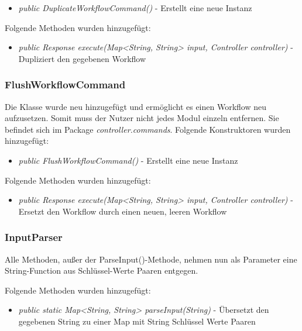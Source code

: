 \documentclass[parskip=full]{scrartcl}
\begin{document}
				\begin{itemize}
					\item \textit{public DuplicateWorkflowCommand()} - Erstellt eine neue Instanz
				\end{itemize}
				
				Folgende Methoden wurden hinzugefügt:
				\begin{itemize}
					\item \textit{public Response execute(Map<String, String> input, Controller controller)} - Dupliziert den gegebenen Workflow
				\end{itemize}
				
			
			\subsubsection{FlushWorkflowCommand}
			Die Klasse wurde neu hinzugefügt und ermöglicht es einen Workflow neu aufzusetzen. Somit muss der Nutzer nicht jedes Modul einzeln entfernen. Sie befindet sich im Package \textit{controller.commands}.
			Folgende Konstruktoren wurden hinzugefügt:
			\begin{itemize}
				\item \textit{public FlushWorkflowCommand()} - Erstellt eine neue Instanz
			\end{itemize}
			
			Folgende Methoden wurden hinzugefügt:
			\begin{itemize}
				\item \textit{public Response execute(Map<String, String> input, Controller controller)} - Ersetzt den Workflow durch einen neuen, leeren Workflow				
			\end{itemize}

			\subsubsection{InputParser}
				Alle Methoden, außer der ParseInput()-Methode, nehmen nun als Parameter eine String-Function aus Schlüssel-Werte Paaren entgegen. 
				
				Folgende Methoden wurden hinzugefügt:
				\begin{itemize}
					\item \textit{public static Map<String, String> parseInput(String)} - Übersetzt den gegebenen String zu einer Map mit String Schlüssel Werte Paaren
					
				
				\end{itemize}
			
\end{document}
